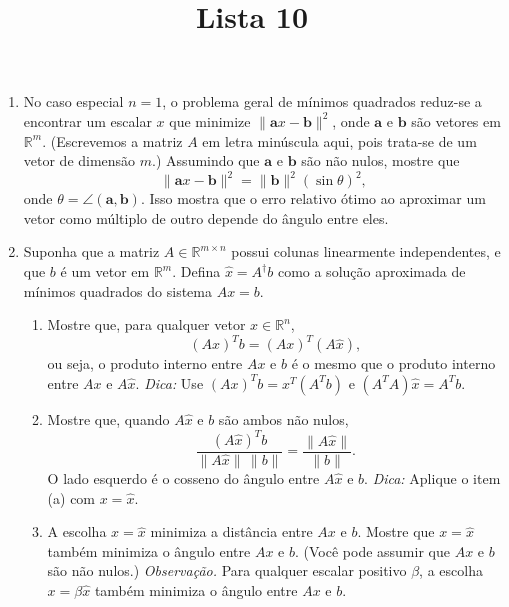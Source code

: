 \documentclass[a4paper,12pt]{article}
\title{Lista 10}
\author{}
\date{}
\begin{document}
\maketitle

\begin{enumerate}
    \item No caso especial $n = 1$, o problema geral de mínimos quadrados reduz-se a encontrar um escalar $x$ que minimize $\|\mathbf{a}x - \mathbf{b}\|^2$, onde $\mathbf{a}$ e $\mathbf{b}$ são vetores em $\mathbb{R}^m$. (Escrevemos a matriz $A$ em letra minúscula aqui, pois trata-se de um vetor de dimensão $m$.) Assumindo que $\mathbf{a}$ e $\mathbf{b}$ são não nulos, mostre que
    $$
    \|\mathbf{a}x - \mathbf{b}\|^2 = \|\mathbf{b}\|^2 (\sin \theta)^2,
    $$
    onde $\theta = \angle(\mathbf{a}, \mathbf{b})$. Isso mostra que o erro relativo ótimo ao aproximar um vetor como múltiplo de outro depende do ângulo entre eles.



    \item Suponha que a matriz $A \in \mathbb{R}^{m \times n}$ possui colunas linearmente independentes, e que $b$ é um vetor em $\mathbb{R}^m$. Defina $\hat{x} = A^\dagger b$ como a solução aproximada de mínimos quadrados do sistema $Ax = b$.

\begin{enumerate}
    \item Mostre que, para qualquer vetor $x \in \mathbb{R}^n$,
    $$
    (Ax)^T b = (Ax)^T (A\hat{x}),
    $$
    ou seja, o produto interno entre $Ax$ e $b$ é o mesmo que o produto interno entre $Ax$ e $A\hat{x}$. \textit{Dica:} Use $(Ax)^T b = x^T (A^T b)$ e $(A^T A)\hat{x} = A^T b$.

    \item Mostre que, quando $A\hat{x}$ e $b$ são ambos não nulos,
    \[
    \frac{(A\hat{x})^T b}{\|A\hat{x}\| \, \|b\|} = 
    \frac{\|A\hat{x}\|}{\|b\|}.
    \]
    O lado esquerdo é o cosseno do ângulo entre $A\hat{x}$ e $b$.  \textit{Dica:} Aplique o item (a) com $x = \hat{x}$.

    \item A escolha $x = \hat{x}$ minimiza a distância entre $Ax$ e $b$. Mostre que $x = \hat{x}$ também minimiza o ângulo entre $Ax$ e $b$. (Você pode assumir que $Ax$ e $b$ são não nulos.) \textit{Observação.} Para qualquer escalar positivo $\beta$, a escolha $x = \beta \hat{x}$ também minimiza o ângulo entre $Ax$ e $b$.
\end{enumerate}


\end{enumerate}
\end{document}
